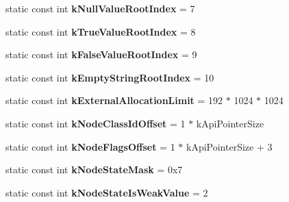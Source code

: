 \begin{DoxyCompactItemize}
\item 
\hypertarget{classv8_1_1internal_1_1Internals_ab311cf753ec5c968052bd83ef21e83f8}{}static const int {\bfseries k\+Null\+Value\+Root\+Index} = 7\label{classv8_1_1internal_1_1Internals_ab311cf753ec5c968052bd83ef21e83f8}

\item 
\hypertarget{classv8_1_1internal_1_1Internals_a93abd58b178eca469bade28e68b5c59e}{}static const int {\bfseries k\+True\+Value\+Root\+Index} = 8\label{classv8_1_1internal_1_1Internals_a93abd58b178eca469bade28e68b5c59e}

\item 
\hypertarget{classv8_1_1internal_1_1Internals_a90b6837aa368bbe4ffd914e6f753b167}{}static const int {\bfseries k\+False\+Value\+Root\+Index} = 9\label{classv8_1_1internal_1_1Internals_a90b6837aa368bbe4ffd914e6f753b167}

\item 
\hypertarget{classv8_1_1internal_1_1Internals_a6f669f3d98fe653b281b26be3bc0655a}{}static const int {\bfseries k\+Empty\+String\+Root\+Index} = 10\label{classv8_1_1internal_1_1Internals_a6f669f3d98fe653b281b26be3bc0655a}

\item 
\hypertarget{classv8_1_1internal_1_1Internals_aa88e5a295f86584aa3e90ebc1a6c4739}{}static const int {\bfseries k\+External\+Allocation\+Limit} = 192 $\ast$ 1024 $\ast$ 1024\label{classv8_1_1internal_1_1Internals_aa88e5a295f86584aa3e90ebc1a6c4739}

\item 
\hypertarget{classv8_1_1internal_1_1Internals_af4fb6d499cb87f03031ad4d6be6bcd8f}{}static const int {\bfseries k\+Node\+Class\+Id\+Offset} = 1 $\ast$ k\+Api\+Pointer\+Size\label{classv8_1_1internal_1_1Internals_af4fb6d499cb87f03031ad4d6be6bcd8f}

\item 
\hypertarget{classv8_1_1internal_1_1Internals_aee5606f2a44d43d8dafe344e0bb753ef}{}static const int {\bfseries k\+Node\+Flags\+Offset} = 1 $\ast$ k\+Api\+Pointer\+Size + 3\label{classv8_1_1internal_1_1Internals_aee5606f2a44d43d8dafe344e0bb753ef}

\item 
\hypertarget{classv8_1_1internal_1_1Internals_a853acc088978d38a5a69091cf857a46d}{}static const int {\bfseries k\+Node\+State\+Mask} = 0x7\label{classv8_1_1internal_1_1Internals_a853acc088978d38a5a69091cf857a46d}

\item 
\hypertarget{classv8_1_1internal_1_1Internals_a8a5d4cc92a6952c2a50922c77a606e68}{}static const int {\bfseries k\+Node\+State\+Is\+Weak\+Value} = 2\label{classv8_1_1internal_1_1Internals_a8a5d4cc92a6952c2a50922c77a606e68}


\end{DoxyCompactItemize}
